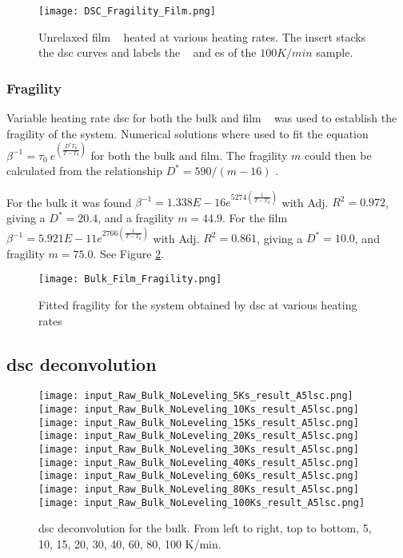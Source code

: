 \documentclass[a4paper,12pt,oneside]{article}%
\begin{document}
\begin{figure}[b]
	\centering
	\texttt{[image: DSC\_Fragility\_Film.png]}
	\caption[Table of contents Capition]{Unrelaxed film \MgZnCa~ heated at various heating rates. The insert stacks the \gls{dsc} curves and labels the \Tg~ and \Tx es of the $100 K/min$ sample.}%
	\label{fig:DSC_vHeatingRate_Film}
\end{figure}

\subsubsection{Fragility}

Variable heating rate \acrshort{dsc} for both the bulk and film \MgZnCa~ was used to establish the fragility of the system. Numerical solutions where used to fit the equation $\beta^{-1} = \tau_{0}~ e^{(\frac{D^{*}T_{0}}{T-T_{0}})}$ \cite{Busch1998} for both the bulk and film. The fragility $m$ could then be calculated from the relationship $D^{*}=590/(m-16)$ \cite{Angell2002, Wei2014}.

For the bulk it was found $\beta^{-1} = 1.338E - 16e^{5274 (\frac{1}{T-T_{0}})}$ with Adj. $R^{2}=0.972$, giving a $D^{*}=20.4$, and a fragility $m=44.9$. For the film $\beta^{-1} = 5.921E - 11e^{2766 (\frac{1}{T-T_{0}})}$ with Adj. $R^{2}=0.861$, giving a $D^{*}=10.0$, and fragility $m=75.0$. See Figure \ref{fig:Fragility_BulkFilm_mValue}.

\begin{figure}[b]
	\centering
	\texttt{[image: Bulk\_Film\_Fragility.png]}
	\caption[Table of contents Capition]{Fitted fragility for the \MgZnCa system obtained by \acrshort{dsc} at various heating rates}
	\label{fig:Fragility_BulkFilm_mValue}
\end{figure}

\subsection{\acrshort{dsc} deconvolution}

\begin{figure}[b]
	\centering
	\texttt{[image: input\_Raw\_Bulk\_NoLeveling\_5Ks\_result\_A5lsc.png]}\quad
	\texttt{[image: input\_Raw\_Bulk\_NoLeveling\_10Ks\_result\_A5lsc.png]}\quad
	\texttt{[image: input\_Raw\_Bulk\_NoLeveling\_15Ks\_result\_A5lsc.png]}
	\medskip
	\texttt{[image: input\_Raw\_Bulk\_NoLeveling\_20Ks\_result\_A5lsc.png]}\quad
	\texttt{[image: input\_Raw\_Bulk\_NoLeveling\_30Ks\_result\_A5lsc.png]}\quad
	\texttt{[image: input\_Raw\_Bulk\_NoLeveling\_40Ks\_result\_A5lsc.png]}
	\medskip
	\texttt{[image: input\_Raw\_Bulk\_NoLeveling\_60Ks\_result\_A5lsc.png]}\quad
	\texttt{[image: input\_Raw\_Bulk\_NoLeveling\_80Ks\_result\_A5lsc.png]}\quad
	\texttt{[image: input\_Raw\_Bulk\_NoLeveling\_100Ks\_result\_A5lsc.png]}
	\caption{\acrshort{dsc} deconvolution for the bulk. From left to right, top to bottom, 5, 10, 15, 20, 30, 40, 60, 80, 100 K/min.}
	\label{fig:DSC_Bulk_Decon}
\end{figure}
\end{document}
